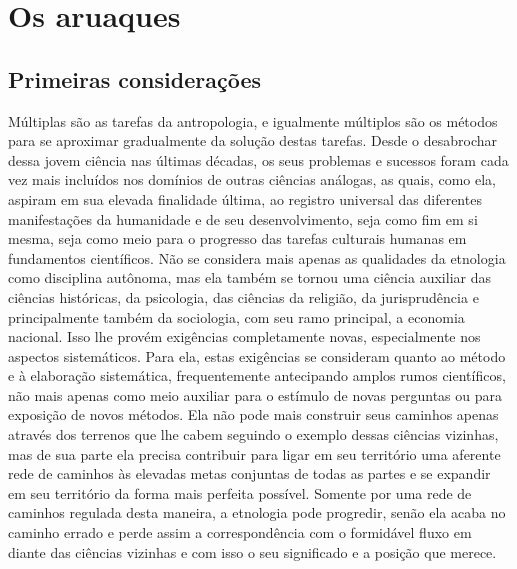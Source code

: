 

\part{Os aruaques}

\chapter*{Primeiras considerações\smallskip{}}

Múltiplas são as tarefas da antropologia, e igualmente múltiplos são os
métodos para se aproximar gradualmente da solução destas tarefas. Desde
o desabrochar dessa jovem ciência nas últimas décadas, os seus problemas
e sucessos foram cada vez mais incluídos nos domínios de outras ciências
análogas, as quais, como ela, aspiram em sua elevada finalidade última,
ao registro universal das diferentes manifestações da humanidade e de
seu desenvolvimento, seja como fim em si mesma, seja como meio para o
progresso das tarefas culturais humanas em fundamentos científicos. Não
se considera mais apenas as qualidades da etnologia como disciplina
autônoma, mas ela também se tornou uma ciência auxiliar das ciências
históricas, da psicologia, das ciências da religião, da jurisprudência
e principalmente também da sociologia, com seu ramo principal, a
economia nacional. Isso lhe provém exigências completamente novas,
especialmente nos aspectos sistemáticos. Para ela, estas exigências se
consideram quanto ao método e à elaboração sistemática, frequentemente
antecipando amplos rumos científicos, não mais apenas como meio
auxiliar para o estímulo de novas perguntas ou para exposição de novos
métodos. Ela não pode mais construir seus caminhos apenas através dos
terrenos que lhe cabem seguindo o exemplo dessas ciências vizinhas, mas
de sua parte ela precisa contribuir para ligar em seu território uma
aferente rede de caminhos às elevadas metas conjuntas de todas as
partes e se expandir em seu território da forma mais perfeita possível.
Somente por uma rede de caminhos regulada desta maneira, a etnologia
pode progredir, senão ela acaba no caminho errado e perde assim a
correspondência com o formidável fluxo em diante das ciências vizinhas e
com isso o seu significado e a posição que merece.

